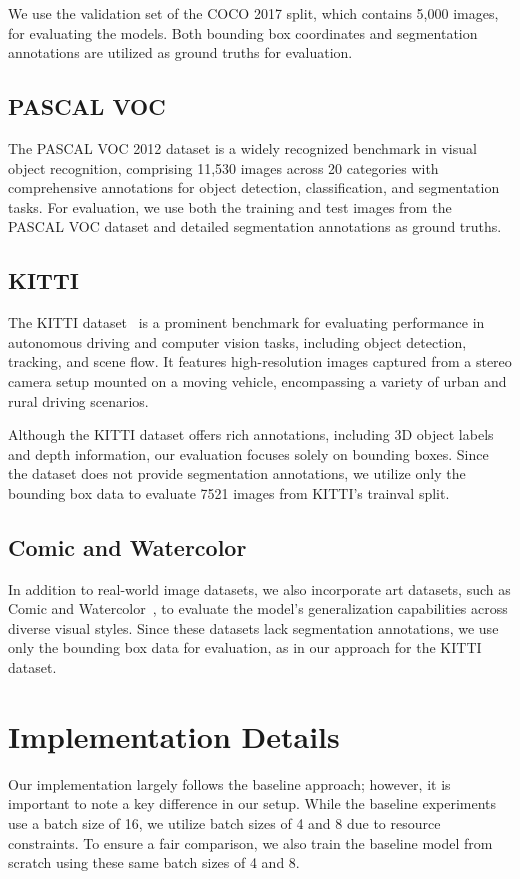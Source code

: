 We use the validation set of the COCO 2017 split, which contains 5,000 images, for evaluating the models. Both bounding box coordinates and segmentation annotations are utilized as ground truths for evaluation.

\subsection{PASCAL VOC}
The PASCAL VOC 2012 dataset is a widely recognized benchmark in visual object recognition, comprising 11,530 images across 20 categories with comprehensive annotations for object detection, classification, and segmentation tasks. For evaluation, we use both the training and test images from the PASCAL VOC dataset and detailed segmentation annotations as ground truths.

\subsection{KITTI}
The KITTI dataset~\cite{Geiger2013IJRR} is a prominent benchmark for evaluating performance in autonomous driving and computer vision tasks, including object detection, tracking, and scene flow. It features high-resolution images captured from a stereo camera setup mounted on a moving vehicle, encompassing a variety of urban and rural driving scenarios. 

Although the KITTI dataset offers rich annotations, including 3D object labels and depth information, our evaluation focuses solely on bounding boxes. Since the dataset does not provide segmentation annotations, we utilize only the bounding box data to evaluate 7521 images from KITTI’s trainval split.

\subsection{Comic and Watercolor}
In addition to real-world image datasets, we also incorporate art datasets, such as Comic and Watercolor~\cite{Inoue_2018_CVPR}, to evaluate the model's generalization capabilities across diverse visual styles. Since these datasets lack segmentation annotations, we use only the bounding box data for evaluation, as in our approach for the KITTI dataset. 

\section{Implementation Details}
Our implementation largely follows the baseline approach; however, it is important to note a key difference in our setup. While the baseline experiments use a batch size of 16, we utilize batch sizes of 4 and 8 due to resource constraints. To ensure a fair comparison, we also train the baseline model from scratch using these same batch sizes of 4 and 8.

